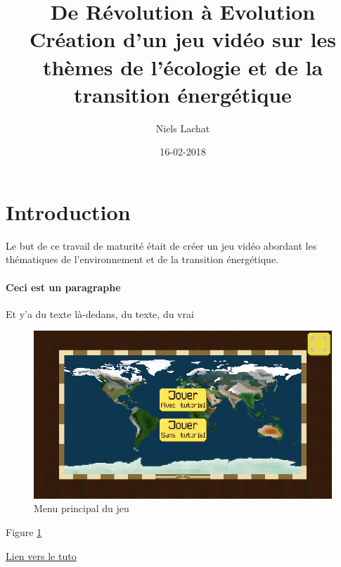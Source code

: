 \documentclass{article}
\title{De Révolution à Evolution \\ Création d'un jeu vidéo sur les thèmes de l'écologie et de la transition énergétique}
\date{16-02-2018}
\author{Niels Lachat}
\begin{document}
        \maketitle
        \newpage

        \section{Introduction}

        Le but de ce travail de maturité était de créer un jeu vidéo abordant les thématiques de l'environnement et de la transition énergétique.
        \paragraph{Ceci est un paragraphe}
        Et y'a du texte là-dedans, du texte, du vrai \\

        \begin{figure}[h]
                \includegraphics[width=\linewidth]{../images/mainMenu}
                \caption{Menu principal du jeu}
                \label{fig:mainMenu}
        \end{figure}

        Figure \ref{fig:mainMenu}

        \href{https://www.latex-tutorial.com/tutorials/figures/}{Lien vers le tuto}
\end{document}
